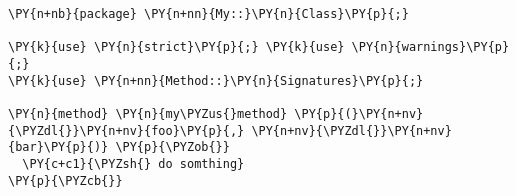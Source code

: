 \begin{Verbatim}[commandchars=\\\{\}]
\PY{n+nb}{package} \PY{n+nn}{My::}\PY{n}{Class}\PY{p}{;}

\PY{k}{use} \PY{n}{strict}\PY{p}{;} \PY{k}{use} \PY{n}{warnings}\PY{p}{;}
\PY{k}{use} \PY{n+nn}{Method::}\PY{n}{Signatures}\PY{p}{;}

\PY{n}{method} \PY{n}{my\PYZus{}method} \PY{p}{(}\PY{n+nv}{\PYZdl{}}\PY{n+nv}{foo}\PY{p}{,} \PY{n+nv}{\PYZdl{}}\PY{n+nv}{bar}\PY{p}{)} \PY{p}{\PYZob{}}
  \PY{c+c1}{\PYZsh{} do somthing}
\PY{p}{\PYZcb{}}
 
\end{Verbatim}
